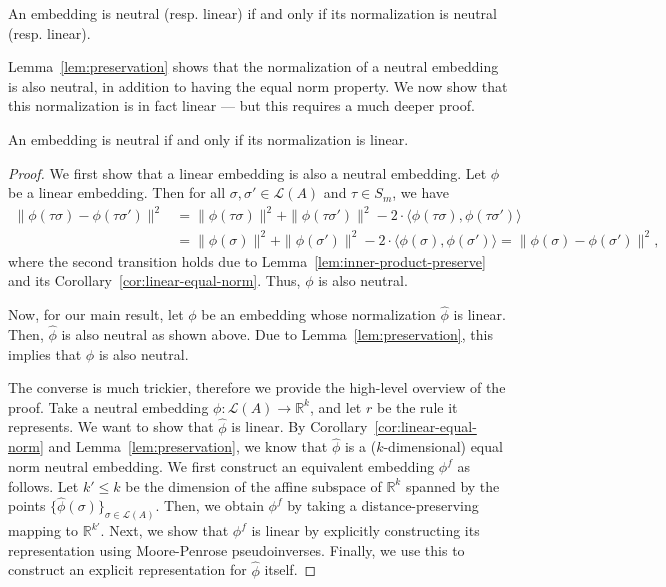 \documentclass[prodmode,acmec]{ec-acmsmall}
\newcommand{\calL}{{\mathcal{L}}}
\newcommand{\rank}{{\calL(A)}}
\begin{document}

\begin{lemma}
An embedding is neutral (resp. linear) if and only if its normalization is neutral (resp. linear). 
\label{lem:preservation}
\end{lemma}

Lemma~\ref{lem:preservation} shows that the normalization of a neutral embedding is also neutral, in addition to having the equal norm property. We now show that this normalization is in fact linear --- but this requires a much deeper proof. 

\begin{theorem}
An embedding is neutral if and only if its normalization is linear. 
\label{thm:neutral-linear}
\end{theorem}
\begin{proof}
We first show that a linear embedding is also a neutral embedding. Let $\phi$ be a linear embedding. Then for all $\sigma,\sigma' \in \rank$ and $\tau \in S_m$, we have
\begin{align*}
\|\phi(\tau \sigma)-\phi(\tau \sigma')\|^2 &= \|\phi(\tau \sigma)\|^2 + \|\phi(\tau \sigma')\|^2 - 2\cdot \langle \phi(\tau \sigma), \phi(\tau \sigma') \rangle \\
&= \|\phi(\sigma)\|^2 + \|\phi(\sigma')\|^2 - 2\cdot \langle \phi(\sigma), \phi(\sigma') \rangle = \|\phi(\sigma)-\phi(\sigma')\|^2,
\end{align*}
where the second transition holds due to Lemma~\ref{lem:inner-product-preserve} and its Corollary~\ref{cor:linear-equal-norm}. Thus, $\phi$ is also neutral. 

Now, for our main result, let $\phi$ be an embedding whose normalization $\hat{\phi}$ is linear. Then, $\hat{\phi}$ is also neutral as shown above. Due to Lemma~\ref{lem:preservation}, this implies that $\phi$ is also neutral.

The converse is much trickier, therefore we provide the high-level overview of the proof. Take a neutral embedding $\phi : \rank \rightarrow \mathbb{R}^k$, and let $r$ be the rule it represents. We want to show that $\hat{\phi}$ is linear. By Corollary~\ref{cor:linear-equal-norm} and Lemma~\ref{lem:preservation}, we know that $\hat{\phi}$ is a ($k$-dimensional) equal norm neutral embedding. We first construct an equivalent embedding $\phi^f$ as follows. Let $k' \le k$ be the dimension of the affine subspace of $\mathbb{R}^k$ spanned by the points $\{\hat{\phi}(\sigma)\}_{\sigma \in \rank}$. Then, we obtain $\phi^f$ by taking a distance-preserving mapping to $\mathbb{R}^{k'}$. Next, we show that $\phi^f$ is linear by explicitly constructing its representation using Moore-Penrose pseudoinverses. Finally, we use this to construct an explicit representation for $\hat{\phi}$ itself. 


\end{proof}
\end{document}
